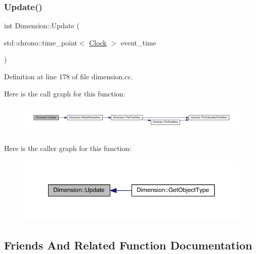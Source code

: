 \subsubsection{\texorpdfstring{Update()}{Update()}}
{\footnotesize\ttfamily int Dimension\+::\+Update (\begin{DoxyParamCaption}\item[{std\+::chrono\+::time\+\_\+point$<$ \hyperlink{universe_8h_a0ef8d951d1ca5ab3cfaf7ab4c7a6fd80}{Clock} $>$}]{event\+\_\+time }\end{DoxyParamCaption})}



Definition at line 178 of file dimension.\+cc.

Here is the call graph for this function\+:
\nopagebreak
\begin{figure}[H]
\begin{center}
\leavevmode
\includegraphics[width=350pt]{class_dimension_a663916c2573b6df4db02ccee5678a75d_cgraph}
\end{center}
\end{figure}
Here is the caller graph for this function\+:
\nopagebreak
\begin{figure}[H]
\begin{center}
\leavevmode
\includegraphics[width=350pt]{class_dimension_a663916c2573b6df4db02ccee5678a75d_icgraph}
\end{center}
\end{figure}


\subsection{Friends And Related Function Documentation}
\mbox{\label{class_dimension_ad04bbaef84caa0d408ec09a1c1302f5f}} 

